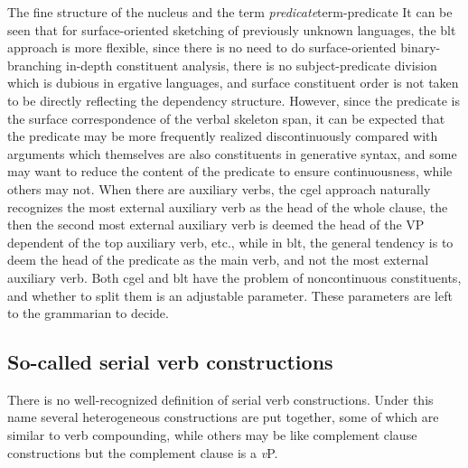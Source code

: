 \documentclass[UTF8, a4paper, oneside, scheme=plain]{ctexart}
\newcommand*{\term}[1]{\emph{#1}}
\newcommand*{\vP}{\textit{v}P}
\begin{document}
\begin{infobox}{The fine structure of the nucleus and the term \term{predicate}}{term-predicate}
    It can be seen that for surface-oriented sketching of previously unknown languages,
    the \ac{blt} approach is more flexible,
    since there is no need to do surface-oriented binary-branching in-depth constituent analysis,
    there is no subject-predicate division which is dubious in ergative languages, %
    and surface constituent order is not taken to be directly reflecting the dependency structure.
    However, since the predicate is the surface correspondence of the verbal skeleton span,
    it can be expected that the predicate may be more frequently realized discontinuously
    compared with arguments which themselves are also constituents in generative syntax,
    and some may want to reduce the content of the predicate to ensure continuousness,
    while others may not.
    When there are auxiliary verbs,
    the \ac{cgel} approach naturally recognizes 
    the most external auxiliary verb as the head of the whole clause,
    the then the second most external auxiliary verb is deemed
    the head of the VP dependent of the top auxiliary verb, etc., 
    while in \ac{blt}, the general tendency is to deem 
    the head of the predicate as the main verb, and not the most external auxiliary verb.
    Both \ac{cgel} and \ac{blt} have the problem of noncontinuous constituents,
    and whether to split them is an adjustable parameter.
    These parameters are left to the grammarian to decide.
\end{infobox}


\subsection{So-called serial verb constructions}\label{sec:serial-verb-construction}

There is no well-recognized definition of serial verb constructions.
Under this name several heterogeneous constructions are put together,
some of which are similar to verb compounding,
while others may be like complement clause constructions but the complement clause is a \vP.
\end{document}
